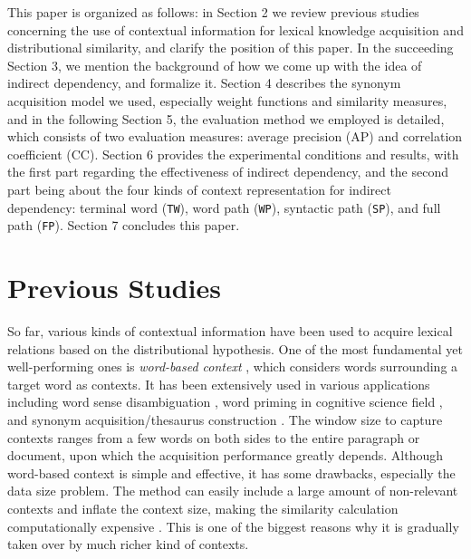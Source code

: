 \documentclass[english]{jnlp_1.4}
\begin{document}
This paper is organized as follows: in Section 2 we review previous
studies concerning the use of contextual information for lexical
knowledge acquisition and distributional similarity, and clarify the
position of this paper.  In the succeeding Section 3, we mention the
background of how we come up with the idea of indirect dependency, and
formalize it.  Section 4 describes the synonym acquisition model we
used, especially weight functions and similarity measures, and in the
following Section 5, the evaluation method we employed is detailed,
which consists of two evaluation measures: average precision (AP) and
correlation coefficient (CC). Section 6 provides the experimental
conditions and results, with the first part regarding the
effectiveness of indirect dependency, and the second part being about
the four kinds of context representation for indirect dependency:
terminal word (\verb|TW|), word path (\verb|WP|), syntactic path
(\verb|SP|), and full path (\verb|FP|). Section 7 concludes this
paper.

\section{Previous Studies}


So far, various kinds of contextual information have been used to
acquire lexical relations based on the distributional hypothesis. One
of the most fundamental yet well-performing ones is {\em word-based
context} \cite{Curran:02:scaling}, which considers words surrounding a
target word as contexts. It has been extensively used in various
applications including word sense disambiguation \cite{Ng:96}, word
priming in cognitive science field \cite{Lowe:00}, and synonym
acquisition/thesaurus construction \cite{Hagiwara:06}. The window size
to capture contexts ranges from a few words on both sides to the
entire paragraph or document, upon which the acquisition performance
greatly depends. Although word-based context is simple and effective,
it has some drawbacks, especially the data size problem. The method
can easily include a large amount of non-relevant contexts and inflate
the context size, making the similarity calculation computationally
expensive \cite{Hagiwara:06}. This is one of the biggest reasons why
it is gradually taken over by much richer kind of contexts.
\end{document}
